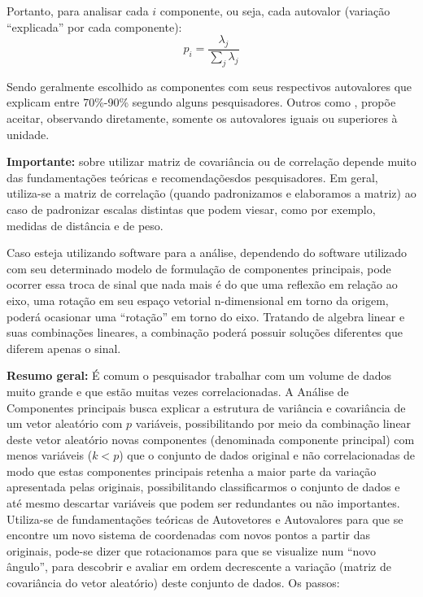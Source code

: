 \documentclass[
  openany]{book}
\begin{document}
Portanto, para analisar cada \(i\) componente, ou seja, cada autovalor (variação ``explicada'' por cada componente):
\begin{equation}
    p_i=\frac{\lambda_j}{\displaystyle \sum_j \lambda_j} 
    \label{eq:varind}
\end{equation}

Sendo geralmente escolhido as componentes com seus respectivos autovalores que explicam entre 70\%-90\% segundo alguns pesquisadores. Outros como \citet{kaiser1960application}, propõe aceitar, observando diretamente, somente os autovalores iguais ou superiores à unidade.

\textbf{Importante:} sobre utilizar matriz de covariância ou de correlação depende muito das fundamentações teóricas e recomendaçõesdos pesquisadores. Em geral, utiliza-se a matriz de correlação (quando padronizamos e elaboramos a matriz) ao caso de padronizar escalas distintas que podem viesar, como por exemplo, medidas de distância e de peso.

Caso esteja utilizando software para a análise, dependendo do software utilizado com seu determinado modelo de formulação de componentes principais, pode ocorrer essa troca de sinal que nada mais é do que uma reflexão em relação ao eixo, uma rotação em seu espaço vetorial n-dimensional em torno da origem, poderá ocasionar uma ``rotação'' em torno do eixo. Tratando de algebra linear e suas combinações lineares, a combinação poderá possuir soluções diferentes que diferem apenas o sinal.

\textbf{Resumo geral:} É comum o pesquisador trabalhar com um volume de dados muito grande e que estão muitas vezes correlacionadas. A Análise de Componentes principais busca explicar a estrutura de variância e covariância de um vetor aleatório com \(p\) variáveis, possibilitando por meio da combinação linear deste vetor aleatório novas componentes (denominada componente principal) com menos variáveis (\(k<p\)) que o conjunto de dados original e não correlacionadas de modo que estas componentes principais retenha a maior parte da variação apresentada pelas originais, possibilitando classificarmos o conjunto de dados e até mesmo descartar variáveis que podem ser redundantes ou não importantes. Utiliza-se de fundamentações teóricas de Autovetores e Autovalores para que se encontre um novo sistema de coordenadas com novos pontos a partir das originais, pode-se dizer que rotacionamos para que se visualize num ``novo ângulo'', para descobrir e avaliar em ordem decrescente a variação (matriz de covariância do vetor aleatório) deste conjunto de dados. Os passos:
\end{document}
